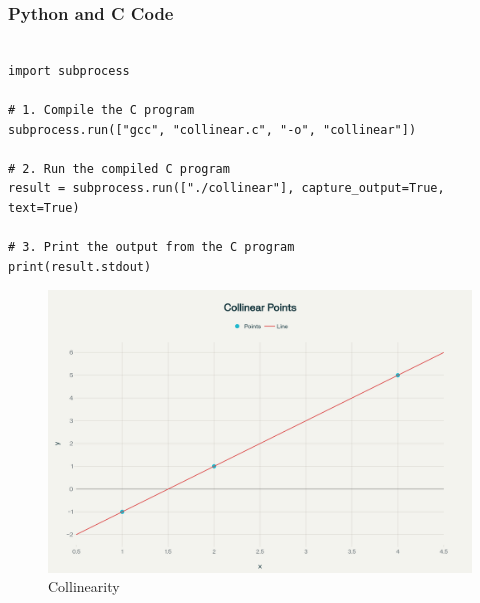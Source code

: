 \documentclass{beamer}
\begin{document}
\begin{frame}[fragile]
\frametitle{Python and C Code}

\begin{lstlisting}

import subprocess

# 1. Compile the C program
subprocess.run(["gcc", "collinear.c", "-o", "collinear"])

# 2. Run the compiled C program
result = subprocess.run(["./collinear"], capture_output=True, text=True)

# 3. Print the output from the C program
print(result.stdout)

\end{lstlisting}

\end{frame}

\begin{figure}
    \centering
    \includegraphics[width=0.8\columnwidth]{figs/fig.png}
    \caption{Collinearity}
    \label{fig:placeholder}
\end{figure}
\end{document}
